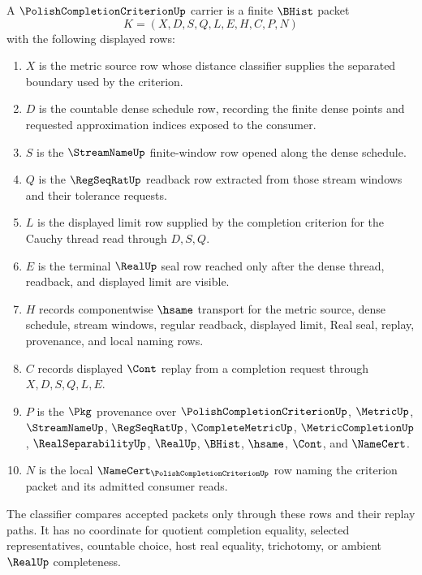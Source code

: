 \begin{definition}
\label{def:polish-completion-criterion-carrier}
A $\PolishCompletionCriterionUp$ carrier is a finite $\BHist$ packet
$$
K=(X,D,S,Q,L,E,H,C,P,N)
$$
with the following displayed rows:
\begin{enumerate}
\item $X$ is the metric source row whose distance classifier supplies the separated boundary used by the criterion.
\item $D$ is the countable dense schedule row, recording the finite dense points and requested approximation indices exposed to the consumer.
\item $S$ is the $\StreamNameUp$ finite-window row opened along the dense schedule.
\item $Q$ is the $\RegSeqRatUp$ readback row extracted from those stream windows and their tolerance requests.
\item $L$ is the displayed limit row supplied by the completion criterion for the Cauchy thread read through $D,S,Q$.
\item $E$ is the terminal $\RealUp$ seal row reached only after the dense thread, readback, and displayed limit are visible.
\item $H$ records componentwise $\hsame$ transport for the metric source, dense schedule, stream windows, regular readback, displayed limit, Real seal, replay, provenance, and local naming rows.
\item $C$ records displayed $\Cont$ replay from a completion request through $X,D,S,Q,L,E$.
\item $P$ is the $\Pkg$ provenance over $\PolishCompletionCriterionUp$, $\MetricUp$, $\StreamNameUp$, $\RegSeqRatUp$, $\CompleteMetricUp$, $\MetricCompletionUp$, $\RealSeparabilityUp$, $\RealUp$, $\BHist$, $\hsame$, $\Cont$, and $\NameCert$.
\item $N$ is the local $\NameCert_{\PolishCompletionCriterionUp}$ row naming the criterion packet and its admitted consumer reads.
\end{enumerate}
The classifier compares accepted packets only through these rows and their replay paths. It has no coordinate for quotient completion equality, selected representatives, countable choice, host real equality, trichotomy, or ambient $\RealUp$ completeness.
\end{definition}

